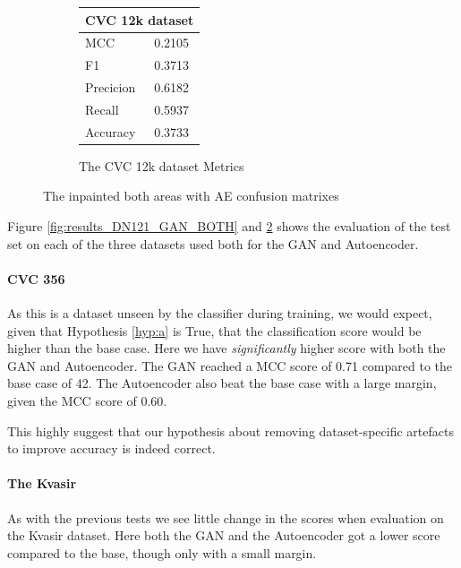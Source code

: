 \begin{figure}
\begin{subfigure}[b]{0.49\textwidth}
\end{subfigure}%
\begin{subfigure}[b]{0.25\textwidth}
        \begin{tabular}{ll}
        \toprule
        \multicolumn{2}{c}{CVC 12k dataset}        \\
        \midrule
        MCC 		& 0.2105 \\
        F1  		& 0.3713  \\
        Precicion  	& 0.6182 \\
        Recall     	& 0.5937 \\
        Accuracy	& 0.3733 \\
        \bottomrule
        \end{tabular}
\caption{The CVC 12k dataset Metrics}
\label{tab:cvc12k_metrics_DN121_AE_BOTH}
\end{subfigure}
\caption{The inpainted both areas with AE confusion matrixes}
\label{fig:results_DN121_AE_BOTH}
\end{figure}
\FloatBarrier

%
Figure \ref{fig:results_DN121_GAN_BOTH} and \ref{fig:results_DN121_AE_BOTH} shows the evaluation of the test set on each of the three datasets used both for the GAN and Autoencoder. 

\paragraph{CVC 356}

As this is a dataset unseen by the classifier during training, we would expect, given that Hypothesis \ref{hyp:a} is True, that the classification score would be higher than the base case.
Here we have \textit{significantly} higher score with both the GAN and Autoencoder. 
The GAN reached a MCC score of 0.71 compared to the base case of 42. The Autoencoder also beat the base case with a large margin, given the MCC score of 0.60.

This highly suggest that our hypothesis about removing dataset-specific artefacts to improve accuracy is indeed correct. 

\paragraph{The Kvasir}
As with the previous tests we see little change in the scores when evaluation on the Kvasir dataset.
Here both the GAN and the Autoencoder got a lower score compared to the base, though only with a small margin.

